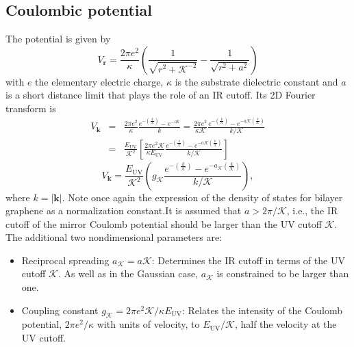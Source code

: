 \documentclass[english,aps,prd,nofootinbib,twocolumn]{revtex4-1}
\begin{document}
\subsection{Coulombic potential}
\label{sect:Potentials-Coulomb}
The potential is given by
\begin{equation}
V_{\mathbf{r}} =
\frac{2\pi e^{2}}{\kappa}\!\!
\left( 
\!
\frac{1}{\sqrt{r^{2}+\mathcal{K}^{-2}  } }
-
\frac{1}{\sqrt{r^{2}+a^{2} } } 
\!
\right)
\end{equation}
with $e$ the elementary electric charge, $\kappa$ is the substrate dielectric constant and $a$ is a short distance limit that plays the role of an IR cutoff. Its 2D Fourier transform is
\begin{eqnarray*}
\nonumber	
V_{\mathbf{k}} &=& 
\frac{2\pi e^{2}}{\kappa} 
\frac{ 
e^{-\left(\!\tfrac{k}{\mathcal{K}}\!\right) }
\!\!-\!
e^{-a k} 
}{k} =
\frac{2\pi e^{2}}{\kappa \mathcal{K} }
\frac{ 
e^{-\left(\!\tfrac{k}{\mathcal{K}}\!\right) }
\!\!-\!
e^{-a \mathcal{K}
\left(\!\tfrac{k}{\mathcal{K}}\!\right) } 
}{k/\mathcal{K}} \\ &=& 
\frac{E_{\mathrm{UV}}}{\mathcal{K}^{2}}
\left[
\frac{2\pi e^{2}\mathcal{K}}{\kappa E_{\mathrm{UV}}}
\frac{ 
e^{-\left(\!\tfrac{k}{\mathcal{K}}\!\right) }
\!\!-\!
e^{-a \mathcal{K}
\left(\!\tfrac{k}{\mathcal{K}}\!\right) } 
}{k/\mathcal{K}}
\right] 
\end{eqnarray*}
\vspace{-.5cm}
\begin{equation}
\label{eq:Fourier-Potential-Coulomb}
V_{\mathbf{k}} = \frac{E_{\mathrm{UV}}}{\mathcal{K}^{2}} 
\left( g_{\mathcal{K}} 
\frac{ 
e^{-\left(\!\tfrac{k}{\mathcal{K}}\!\right) }
\!\!-\!
e^{-a_{\mathcal{K}} 
\left(\!\tfrac{k}{\mathcal{K}}\!\right) } 
}{k/\mathcal{K}}
\right),
\end{equation}
where $k=|\mathbf{k}|$. Note once again the expression of the density of states for bilayer graphene as a normalization constant.It is assumed that $a>2\pi/\mathcal{K}$, i.e., the IR cutoff of the mirror Coulomb potential should be larger than the UV cutoff $\mathcal{K}$. The additional two nondimensional parameters are:
\begin{itemize}
\item Reciprocal spreading $a_{\mathcal{K}}=a\mathcal{K}$: Determines the IR cutoff in terms of the UV cutoff $\mathcal{K}$. As well as in the Gaussian case, $a_{\mathcal{K}}$ is constrained to be larger than one.
\item Coupling constant $g_{\mathcal{K}}=2\pi e^{2}\mathcal{K}/\kappa E_{\mathrm{UV}}$: Relates the intensity of the Coulomb potential, $2\pi e^{2}/\kappa$ with units of velocity, to $E_{\mathrm{UV}}/\mathcal{K}$, half the velocity at the UV cutoff. 
\end{itemize}
\end{document}
